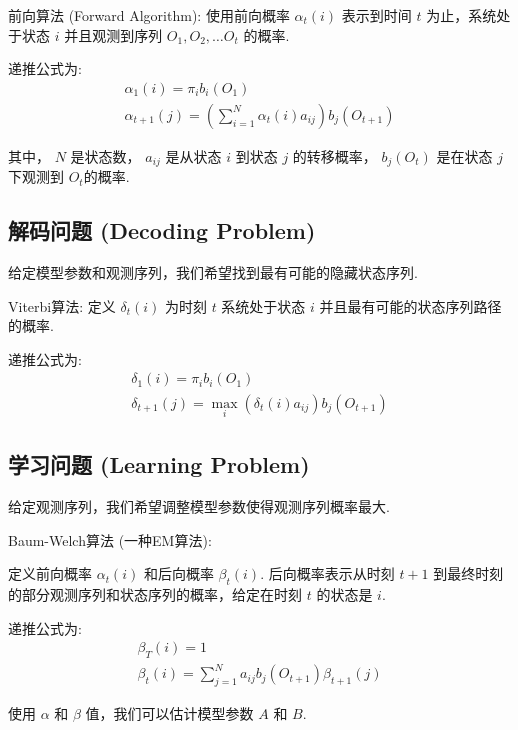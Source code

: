 \documentclass[UTF8,12pt]{ctexart}
\numberwithin{equation}{section}%
\begin{document}
	前向算法 (Forward Algorithm):
	使用前向概率 $\alpha_t(i)$ 表示到时间 $t$ 为止，系统处于状态 $i$ 并且观测到序列 $O_1, O_2, \ldots O_t$ 的概率.
	
	递推公式为:
	$$
	\begin{gathered}
		\alpha_1(i)=\pi_i b_i\left(O_1\right) \\
		\alpha_{t+1}(j)=\left(\sum_{i=1}^N \alpha_t(i) a_{i j}\right) b_j\left(O_{t+1}\right)
	\end{gathered}
	$$
	
	其中， $N$ 是状态数， $a_{i j}$ 是从状态 $i$ 到状态 $j$ 的转移概率， $b_j\left(O_t\right)$ 是在状态 $j$ 下观测到 $O_t$的概率.
	
	\subsection{解码问题 (Decoding Problem)}
	
	给定模型参数和观测序列，我们希望找到最有可能的隐藏状态序列.
	
	Viterbi算法:
	定义 $\delta_t(i)$ 为时刻 $t$ 系统处于状态 $i$ 并且最有可能的状态序列路径的概率.
	
	递推公式为:
	$$
	\begin{gathered}
		\delta_1(i)=\pi_i b_i\left(O_1\right) \\
		\delta_{t+1}(j)=\max _i\left(\delta_t(i) a_{i j}\right) b_j\left(O_{t+1}\right)
	\end{gathered}
	$$
	\subsection{学习问题 (Learning Problem)}

	给定观测序列，我们希望调整模型参数使得观测序列概率最大.
	
	Baum-Welch算法 (一种EM算法):
	
	定义前向概率 $\alpha_t(i)$ 和后向概率 $\beta_t(i)$. 后向概率表示从时刻 $t+1$ 到最终时刻的部分观测序列和状态序列的概率，给定在时刻 $t$ 的状态是 $i$.
	
	递推公式为:
	$$
	\begin{gathered}
		\beta_T(i)=1 \\
		\beta_t(i)=\sum_{j=1}^N a_{i j} b_j\left(O_{t+1}\right) \beta_{t+1}(j)
	\end{gathered}
	$$
	
	使用 $\alpha$ 和 $\beta$ 值，我们可以估计模型参数 $A$ 和 $B$.
	\newpage
\end{document}
